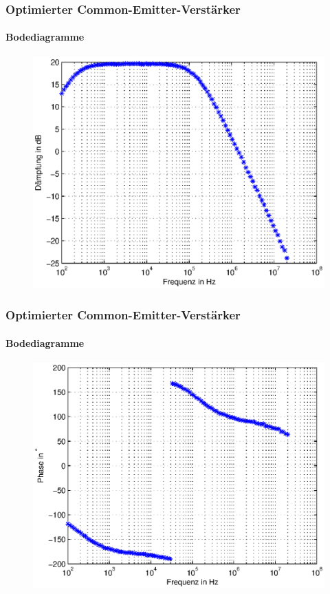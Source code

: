 \begin{frame}
    \frametitle{Optimierter Common-Emitter-Verstärker}
    \framesubtitle{Bodediagramme}
    \begin{figure}[H]
    \begin{center}
            \includegraphics[scale=0.5]{./img/bode/Aufgabe_3_2_db.eps}
    \end{center}
    \end{figure}
\end{frame}
\begin{frame}
    \frametitle{Optimierter Common-Emitter-Verstärker}
    \framesubtitle{Bodediagramme}
    \begin{figure}[H]
    \begin{center}
            \includegraphics[scale=0.5]{./img/bode/Aufgabe_3_2_ph.eps}
    \end{center}
    \end{figure}
\end{frame}

